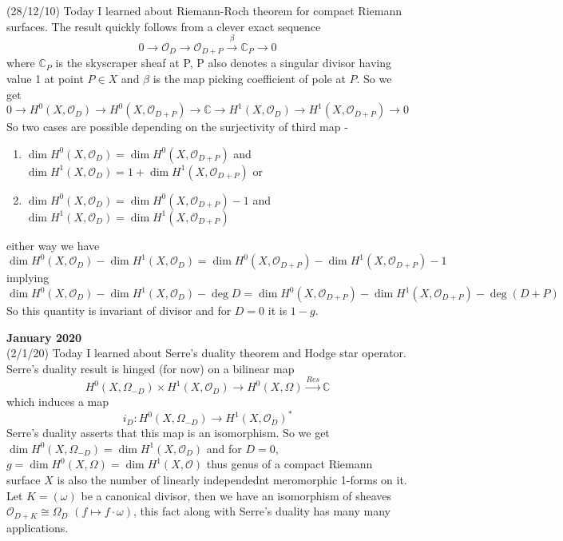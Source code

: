 \documentclass[12pt,a4paper]{article}
\begin{document}
(28/12/10) Today I learned about Riemann-Roch theorem for compact Riemann surfaces. The result quickly follows from a clever exact sequence \[ 0 \to \mathcal{O}_D \to \mathcal{O}_{D+P} \xrightarrow{\beta} \mathbb{C}_P \to 0 \] where $\mathbb{C}_P$ is the skyscraper sheaf at P, P also denotes a singular divisor having value 1 at point $P\in X$ and $\beta$ is the map picking coefficient of pole at $P$. So we get \[ 0 \to H^0(X,\mathcal{O}_D) \to H^0(X,\mathcal{O}_{D+P}) \to \mathbb{C} \to H^1(X,\mathcal{O}_D) \to H^1(X,\mathcal{O}_{D+P}) \to 0\] So two cases are possible depending on the surjectivity of third map -  \begin{enumerate}
	\item $\dim H^0(X,\mathcal{O}_D) = \dim H^0(X,\mathcal{O}_{D+P})$ and $\dim H^1(X,\mathcal{O}_D) = 1+ \dim H^1(X,\mathcal{O}_{D+P})$ or 
	\item $\dim H^0(X,\mathcal{O}_D) = \dim H^0(X,\mathcal{O}_{D+P}) - 1$ and $\dim H^1(X,\mathcal{O}_D) = \dim H^1(X,\mathcal{O}_{D+P})$
\end{enumerate}
either way we have $$\dim H^0(X,\mathcal{O}_D) - \dim H^1(X,\mathcal{O}_D) = \dim H^0(X,\mathcal{O}_{D+P}) - \dim H^1(X,\mathcal{O}_{D+P}) - 1$$ implying 
$$ \dim H^0(X,\mathcal{O}_D) - \dim H^1(X,\mathcal{O}_D) - \deg D = \dim H^0(X,\mathcal{O}_{D+P}) - \dim H^1(X,\mathcal{O}_{D+P}) - \deg (D+P)$$
So this quantity is invariant of divisor and for $D=0$ it is $1-g$.
\\

\maketitle\textbf{January 2020}
\\

(2/1/20) Today I learned about Serre's duality theorem and Hodge star operator. Serre's duality result is hinged (for now) on a bilinear map \[ H^0(X,\Omega_{-D}) \times H^1(X,\mathcal{O}_D) \to  H^0(X,\Omega) \xrightarrow{Res} \mathbb{C} \] which induces a map \[ i_D : H^0(X,\Omega_{-D} )\to H^1(X,\mathcal{O}_D)^*\]
Serre's duality asserts that this map is an isomorphism. So we get $ \dim  H^0(X,\Omega_{-D})=\dim H^1(X,\mathcal{O}_D)$ and for $D=0$, $g= \dim  H^0(X,\Omega)=\dim H^1(X,\mathcal{O})$ thus genus of a compact Riemann surface $X$ is also the number of linearly independednt meromorphic 1-forms on it. Let $K=(\omega)$ be a canonical divisor, then we have an isomorphism of sheaves $\mathcal{O}_{D+K} \cong \Omega_D$ $(f\mapsto f\cdot \omega)$, this fact along with Serre's duality has many many applications. 
\end{document}
